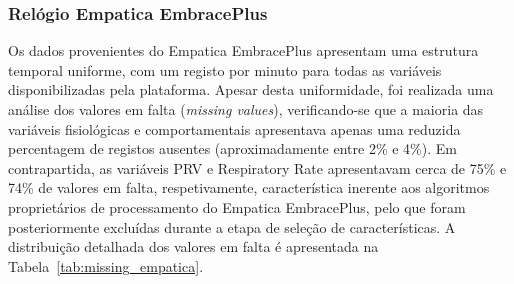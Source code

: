 \subsubsection*{Relógio Empatica EmbracePlus}

Os dados provenientes do Empatica EmbracePlus apresentam uma estrutura temporal uniforme, com um registo por minuto para todas as variáveis disponibilizadas pela plataforma. Apesar desta uniformidade, foi realizada uma análise dos valores em falta (\textit{missing values}), verificando-se que a maioria das variáveis fisiológicas e comportamentais apresentava apenas uma reduzida percentagem de registos ausentes (aproximadamente entre 2\% e 4\%). Em contrapartida, as variáveis PRV e Respiratory Rate apresentavam cerca de 75\% e 74\% de valores em falta, respetivamente, característica inerente aos algoritmos proprietários de processamento do Empatica EmbracePlus, pelo que foram posteriormente excluídas durante a etapa de seleção de características. A distribuição detalhada dos valores em falta é apresentada na Tabela~\ref{tab:missing_empatica}.

